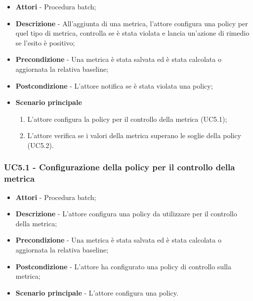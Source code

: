                 \begin{itemize}

                    \item \textbf{Attori} - Procedura batch;
                    \item \textbf{Descrizione} - All'aggiunta di una metrica, l'attore configura una policy
                    per quel tipo di metrica, controlla se è stata violata e lancia un'azione di rimedio se l'esito è positivo;
                    \item \textbf{Precondizione} - Una metrica è stata salvata ed è stata calcolata o aggiornata la relativa
                    baseline;
                    \item \textbf{Postcondizione} - L'attore notifica se è stata violata una policy;
                    \item \textbf{Scenario principale}
                        \begin{enumerate}

                            \item L'attore configura la policy per il controllo della metrica (UC5.1);
                            \item L'attore verifica se i valori della metrica superano le soglie della policy (UC5.2).

                        \end{enumerate}

                \end{itemize}

                \subsubsection{UC5.1 - Configurazione della policy per il controllo della metrica}


                    \begin{itemize}

                        \item \textbf{Attori} - Procedura batch;
                        \item \textbf{Descrizione} - L'attore configura una policy da utilizzare per il controllo della
                        metrica;
                        \item \textbf{Precondizione} - Una metrica è stata salvata ed è stata calcolata o aggiornata la relativa
                        baseline;
                        \item \textbf{Postcondizione} - L'attore ha configurato una policy di controllo sulla metrica;
                        \item \textbf{Scenario principale} - L'attore configura una policy.

                    \end{itemize}

